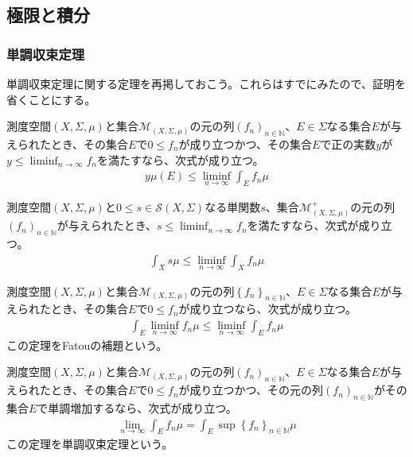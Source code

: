\documentclass[dvipdfmx]{jsarticle}
\begin{document}
\subsection{極限と積分}%
\subsubsection{単調収束定理}%
単調収束定理に関する定理を再掲しておこう。これらはすでにみたので、証明を省くことにする。
\begin{thm*}
測度空間$(X,\varSigma,\mu)$と集合$\mathcal{M}_{(X,\varSigma,\mu)}$の元の列$\left( f_{n} \right)_{n \in \mathbb{N}}$、$E \in \varSigma$なる集合$E$が与えられたとき、その集合$E$で$0 \leq f_{n}$が成り立つかつ、その集合$E$で正の実数$y$が$y \leq \liminf_{n \rightarrow \infty}f_{n}$を満たすなら、次式が成り立つ。
\begin{align*}
y\mu(E) \leq \liminf_{n \rightarrow \infty}{\int_{E} {f_{n}\mu}}
\end{align*}
\end{thm*}
\begin{thm*}
測度空間$(X,\varSigma,\mu)$と$0 \leq s \in \mathcal{S}(X,\varSigma)$なる単関数$s$、集合$\mathcal{M}_{(X,\varSigma,\mu)}^{+}$の元の列$\left( f_{n} \right)_{n \in \mathbb{N}}$が与えられたとき、$s \leq \liminf_{n \rightarrow \infty}f_{n}$を満たすなら、次式が成り立つ。
\begin{align*}
\int_{X} {s\mu} \leq \liminf_{n \rightarrow \infty}{\int_{X} {f_{n}\mu}}
\end{align*}
\end{thm*}
\begin{thm*}
測度空間$(X,\varSigma,\mu)$と集合$\mathcal{M}_{(X,\varSigma,\mu)}$の元の列$\left\{ f_{n} \right\}_{n \in \mathbb{N}}$、$E \in \varSigma$なる集合$E$が与えられたとき、その集合$E$で$0 \leq f_{n}$が成り立つなら、次式が成り立つ。
\begin{align*}
\int_{E} {\liminf_{n \rightarrow \infty}f_{n}\mu} \leq \liminf_{n \rightarrow \infty}{\int_{E} {f_{n}\mu}}
\end{align*}
この定理をFatouの補題という。
\end{thm*}
\begin{thm*}
測度空間$(X,\varSigma,\mu)$と集合$\mathcal{M}_{(X,\varSigma,\mu)}$の元の列$\left( f_{n} \right)_{n \in \mathbb{N}}$、$E \in \varSigma$なる集合$E$が与えられたとき、その集合$E$で$0 \leq f_{n}$が成り立つかつ、その元の列$\left( f_{n} \right)_{n \in \mathbb{N}}$がその集合$E$で単調増加するなら、次式が成り立つ。
\begin{align*}
\lim_{n \rightarrow \infty}{\int_{E} {f_{n}\mu}} = \int_{E} {\sup\left\{ f_{n} \right\}_{n \in \mathbb{N}}\mu}
\end{align*}
この定理を単調収束定理という。
\end{thm*}
\end{document}
